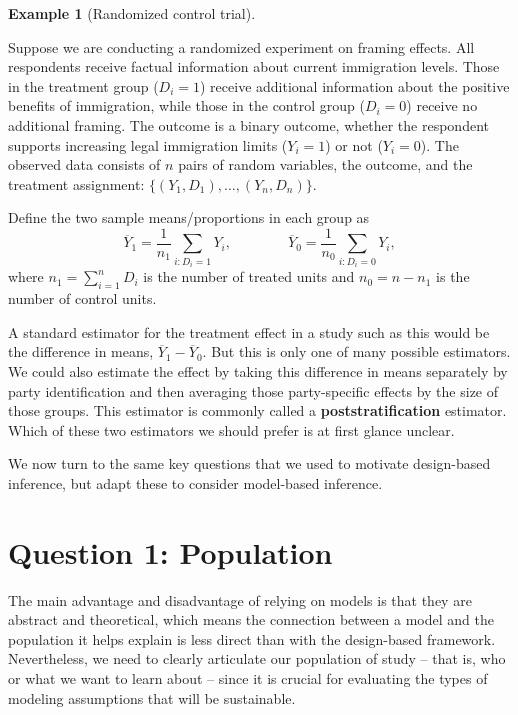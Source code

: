 \documentclass[
  13pt,
  letterpaper,
  DIV=11,
  numbers=noendperiod]{scrreprt}
\newcommand{\Ybar}{\overline{Y}}
\theoremstyle{definition}
\theoremstyle{definition}
\newtheorem{example}{Example}[chapter]
\theoremstyle{plain}
\theoremstyle{remark}
\begin{document}
\begin{example}[Randomized control
trial]\protect\hypertarget{exm-rct}{}\label{exm-rct}

Suppose we are conducting a randomized experiment on framing effects.
All respondents receive factual information about current immigration
levels. Those in the treatment group (\(D_i = 1\)) receive additional
information about the positive benefits of immigration, while those in
the control group (\(D_i = 0\)) receive no additional framing. The
outcome is a binary outcome, whether the respondent supports increasing
legal immigration limits (\(Y_i = 1\)) or not (\(Y_i = 0\)). The
observed data consists of \(n\) pairs of random variables, the outcome,
and the treatment assignment: \(\{(Y_1, D_1), \ldots, (Y_n, D_n)\}\).

Define the two sample means/proportions in each group as \[
\Ybar_1 = \frac{1}{n_1} \sum_{i: D_i = 1} Y_i, \qquad\qquad \Ybar_0 = \frac{1}{n_0} \sum_{i: D_i = 0} Y_i,
\] where \(n_1 = \sum_{i=1}^n D_i\) is the number of treated units and
\(n_0 = n - n_1\) is the number of control units.

A standard estimator for the treatment effect in a study such as this
would be the difference in means, \(\Ybar_1 - \Ybar_0\). But this is
only one of many possible estimators. We could also estimate the effect
by taking this difference in means separately by party identification
and then averaging those party-specific effects by the size of those
groups. This estimator is commonly called a \textbf{poststratification}
estimator. Which of these two estimators we should prefer is at first
glance unclear.

\end{example}

We now turn to the same key questions that we used to motivate
design-based inference, but adapt these to consider model-based
inference.

\section{Question 1: Population}\label{question-1-population-1}

The main advantage and disadvantage of relying on models is that they
are abstract and theoretical, which means the connection between a model
and the population it helps explain is less direct than with the
design-based framework. Nevertheless, we need to clearly articulate our
population of study -- that is, who or what we want to learn about --
since it is crucial for evaluating the types of modeling assumptions
that will be sustainable.
\end{document}
